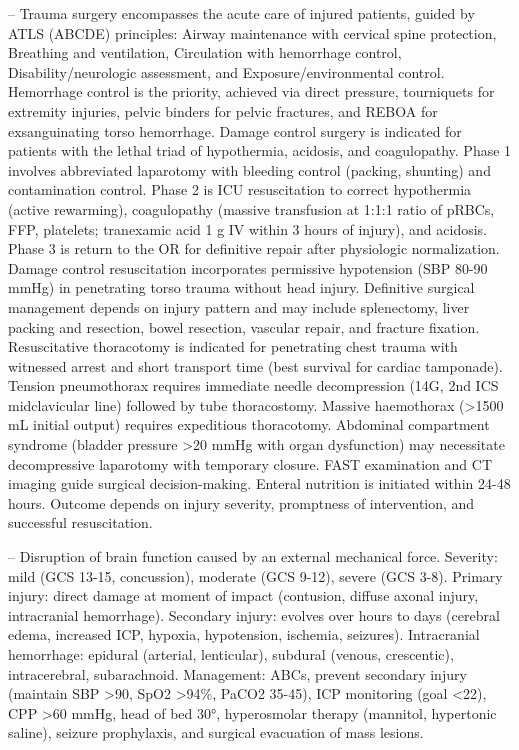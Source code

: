-- Trauma surgery encompasses the acute care of injured patients, guided by ATLS (ABCDE) principles: Airway maintenance with cervical spine protection, Breathing and ventilation, Circulation with hemorrhage control, Disability/neurologic assessment, and Exposure/environmental control. Hemorrhage control is the priority, achieved via direct pressure, tourniquets for extremity injuries, pelvic binders for pelvic fractures, and REBOA for exsanguinating torso hemorrhage. Damage control surgery is indicated for patients with the lethal triad of hypothermia, acidosis, and coagulopathy. Phase 1 involves abbreviated laparotomy with bleeding control (packing, shunting) and contamination control. Phase 2 is ICU resuscitation to correct hypothermia (active rewarming), coagulopathy (massive transfusion at 1:1:1 ratio of pRBCs, FFP, platelets; tranexamic acid 1 g IV within 3 hours of injury), and acidosis. Phase 3 is return to the OR for definitive repair after physiologic normalization. Damage control resuscitation incorporates permissive hypotension (SBP 80-90 mmHg) in penetrating torso trauma without head injury. Definitive surgical management depends on injury pattern and may include splenectomy, liver packing and resection, bowel resection, vascular repair, and fracture fixation. Resuscitative thoracotomy is indicated for penetrating chest trauma with witnessed arrest and short transport time (best survival for cardiac tamponade). Tension pneumothorax requires immediate needle decompression (14G, 2nd ICS midclavicular line) followed by tube thoracostomy. Massive haemothorax (>1500 mL initial output) requires expeditious thoracotomy. Abdominal compartment syndrome (bladder pressure >20 mmHg with organ dysfunction) may necessitate decompressive laparotomy with temporary closure. FAST examination and CT imaging guide surgical decision-making. Enteral nutrition is initiated within 24-48 hours. Outcome depends on injury severity, promptness of intervention, and successful resuscitation.

-- Disruption of brain function caused by an external mechanical force. Severity: mild (GCS 13-15, concussion), moderate (GCS 9-12), severe (GCS 3-8). Primary injury: direct damage at moment of impact (contusion, diffuse axonal injury, intracranial hemorrhage). Secondary injury: evolves over hours to days (cerebral edema, increased ICP, hypoxia, hypotension, ischemia, seizures). Intracranial hemorrhage: epidural (arterial, lenticular), subdural (venous, crescentic), intracerebral, subarachnoid. Management: ABCs, prevent secondary injury (maintain SBP >90, SpO2 >94\%, PaCO2 35-45), ICP monitoring (goal <22), CPP >60 mmHg, head of bed 30°, hyperosmolar therapy (mannitol, hypertonic saline), seizure prophylaxis, and surgical evacuation of mass lesions.

